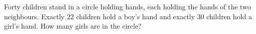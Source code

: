 Forty children stand in a circle holding hands, each holding the hands of the two neighbours. Exactly $22$ children hold a boy's hand and exactly $30$ children hold a girl's hand. How many girls are in the circle?
